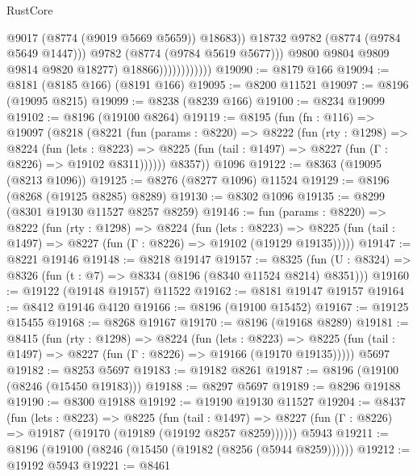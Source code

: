 \begin{lexlean}{RustCore}
\begin{coremodule}
                                      @9017
                                      (@8774 (@9019 @5669 @5659))
                                      @18683))
                                  @18732
                                  @9782
                                  (@8774 (@9784 @5649 @1447)))
                                @9782
                                (@8774 (@9784 @5619 @5677)))
                              @9800
                              @9804
                              @9809
                              @9814
                              @9820
                              @18277)
                            @18866))))))))))))
@19090 := @8179 @166
@19094 := @8181 (@8185 @166) (@8191 @166)
@19095 := @8200 @11521
@19097 := @8196 (@19095 @8215)
@19099 := @8238 (@8239 @166)
@19100 := @8234 @19099
@19102 := @8196 (@19100 @8264)
@19119 := @8195
    (fun (fn : @116) =>
    @19097
      (@8218
        (@8221
          (fun (params : @8220) =>
          @8222
            (fun (rty : @1298) =>
            @8224
              (fun (lets : @8223) =>
              @8225 (fun (tail : @1497) => @8227 (fun (Γ : @8226) => @19102 @8311))))))
        @8357))
    @1096
@19122 := @8363 (@19095 (@8213 @1096))
@19125 := @8276 (@8277 @1096) @11524
@19129 := @8196 (@8268 (@19125 @8285) @8289)
@19130 := @8302 @1096
@19135 := @8299 (@8301 @19130 @11527 @8257 @8259)
@19146 := fun (params : @8220) =>
  @8222
    (fun (rty : @1298) =>
    @8224
      (fun (lets : @8223) =>
      @8225 (fun (tail : @1497) => @8227 (fun (Γ : @8226) => @19102 (@19129 @19135)))))
@19147 := @8221 @19146
@19148 := @8218 @19147
@19157 := @8325
    (fun (U : @8324) => @8326 (fun (t : @7) => @8334 (@8196 (@8340 @11524 @8214) @8351)))
@19160 := @19122 (@19148 @19157) @11522
@19162 := @8181 @19147 @19157
@19164 := @8412 @19146 @4120
@19166 := @8196 (@19100 @15452)
@19167 := @19125 @15455
@19168 := @8268 @19167
@19170 := @8196 (@19168 @8289)
@19181 := @8415
    (fun (rty : @1298) =>
    @8224
      (fun (lets : @8223) =>
      @8225 (fun (tail : @1497) => @8227 (fun (Γ : @8226) => @19166 (@19170 @19135)))))
    @5697
@19182 := @8253 @5697
@19183 := @19182 @8261
@19187 := @8196 (@19100 (@8246 (@15450 @19183)))
@19188 := @8297 @5697
@19189 := @8296 @19188
@19190 := @8300 @19188
@19192 := @19190 @19130 @11527
@19204 := @8437
    (fun (lets : @8223) =>
    @8225
      (fun (tail : @1497) =>
      @8227 (fun (Γ : @8226) => @19187 (@19170 (@19189 (@19192 @8257 @8259))))))
    @5943
@19211 := @8196 (@19100 (@8246 (@15450 (@19182 (@8256 (@5944 @8259))))))
@19212 := @19192 @5943
@19221 := @8461

\end{coremodule}
\end{lexlean}

